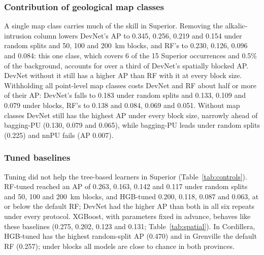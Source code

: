 \documentclass[pdflatex,sn-apa]{sn-jnl}
\begin{document}
\subsubsection{Contribution of geological map classes}\label{sec:res-featuresets}

A single map class carries much of the skill in Superior. Removing the alkalic-intrusion column lowers DevNet's AP to 0.345, 0.256, 0.219 and 0.154 under random splits and 50, 100 and 200~km blocks, and RF's to 0.230, 0.126, 0.096 and 0.084: this one class, which covers 6 of the 15 Superior occurrences and 0.5\% of the background, accounts for over a third of DevNet's spatially blocked AP. DevNet without it still has a higher AP than RF with it at every block size. Withholding all point-level map classes costs DevNet and RF about half or more of their AP: DevNet's falls to 0.183 under random splits and 0.133, 0.109 and 0.079 under blocks, RF's to 0.138 and 0.084, 0.069 and 0.051. Without map classes DevNet still has the highest AP under every block size, narrowly ahead of bagging-PU (0.130, 0.079 and 0.065), while bagging-PU leads under random splits (0.225) and nnPU fails (AP 0.007).

\subsubsection{Tuned baselines}\label{sec:res-controls}

Tuning did not help the tree-based learners in Superior (Table~\ref{tab:controls}). RF-tuned reached an AP of 0.263, 0.163, 0.142 and 0.117 under random splits and 50, 100 and 200~km blocks, and HGB-tuned 0.200, 0.118, 0.087 and 0.063, at or below the default RF; DevNet had the higher AP than both in all six repeats under every protocol. XGBoost, with parameters fixed in advance, behaves like these baselines (0.275, 0.202, 0.123 and 0.131; Table~\ref{tab:spatial}). In Cordillera, HGB-tuned has the highest random-split AP (0.470) and in Grenville the default RF (0.257); under blocks all models are close to chance in both provinces.
\end{document}
